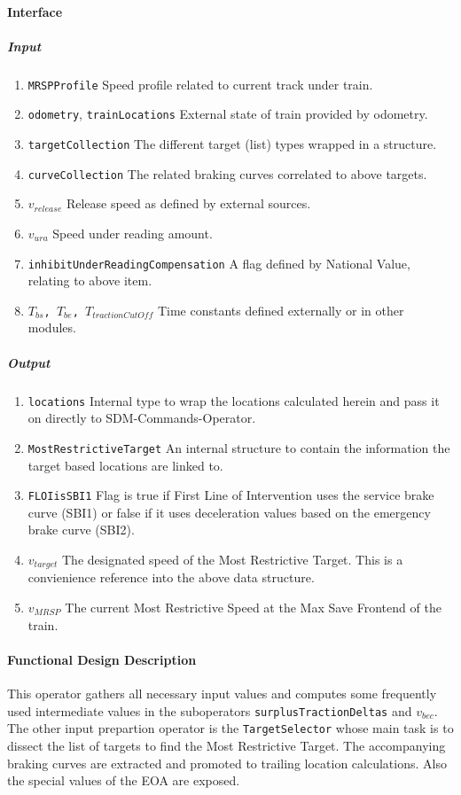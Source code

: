 \paragraph{Interface}
\subparagraph{Input}
\begin{enumerate}
  \item \texttt{MRSPProfile} Speed profile related to current track under train.
  \item \texttt{odometry}, \texttt{trainLocations} External state of train provided by odometry.
  \item \texttt{targetCollection} The different target (list) types wrapped in a structure.
  \item \texttt{curveCollection} The related braking curves correlated to above targets.
  \item \texttt{$v_{release}$} Release speed as defined by external sources.
  \item \texttt{$v_{ura}$} Speed under reading amount.
  \item \texttt{inhibitUnderReadingCompensation} A flag defined by National Value, relating to above item.
  \item \texttt{$T_{bs}$, $T_{be}$, $T_{tractionCutOff}$} Time constants defined externally or in other modules.
\end{enumerate}
\subparagraph{Output}
\begin{enumerate}
  \item \texttt{locations} Internal type to wrap the locations calculated herein and pass it on directly to SDM-Commands-Operator.
  \item \texttt{MostRestrictiveTarget} An internal structure to contain the information the target based locations are linked to.
  \item \texttt{FLOIisSBI1} Flag is true if First Line of Intervention uses the service brake curve (SBI1) or false if it uses deceleration values based on the emergency brake curve (SBI2).
  \item \texttt{$v_{target}$} The designated speed of the Most Restrictive Target. This is a convienience reference into the above data structure. 
  \item \texttt{$v_{MRSP}$} The current Most Restrictive Speed at the Max Save Frontend of the train.
\end{enumerate}

\paragraph{Functional Design Description}
This operator gathers all necessary input values and computes some frequently used intermediate values in the suboperators \texttt{surplusTractionDeltas} and \texttt{$v_{bec}$}. The other input prepartion operator is the \texttt{TargetSelector} whose main task is to dissect the list of targets to find the Most Restrictive Target. The accompanying braking curves are extracted and promoted to trailing location calculations. Also the special values of the EOA are exposed.

